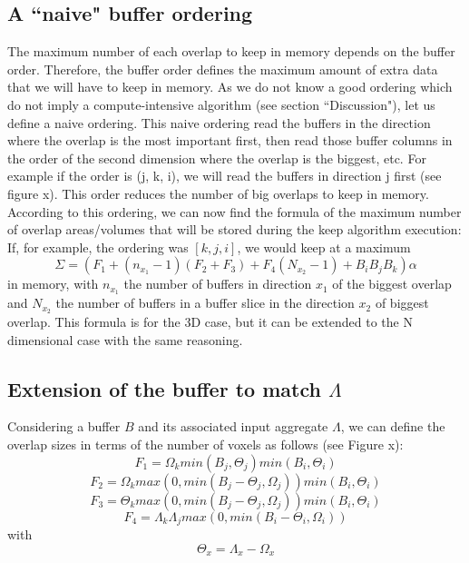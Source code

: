 \documentclass[conference]{IEEEtran}
\begin{document}
\subsection{A ``naive" buffer ordering}
The maximum number of each overlap to keep in memory depends on the buffer order.
Therefore, the buffer order defines the maximum amount of extra data that we will have to keep in memory.
As we do not know a good ordering which do not imply a compute-intensive algorithm (see section ``Discussion"), let us define a naive ordering.
This naive ordering read the buffers in the direction where the overlap is the most important first, then read those buffer columns in the order of the second dimension where the overlap is the biggest, etc.
For example if the order is (j, k, i), we will read the buffers in direction j first (see figure x).
This order reduces the number of big overlaps to keep in memory. \\

According to this ordering, we can now find the formula of the maximum number of overlap areas/volumes that will be stored during the keep algorithm execution:
If, for example, the ordering was $[k,j,i]$, we would keep at a maximum $$\Sigma = (F_1 + (n_{x_1}-1)(F_2 + F_3) + F_4(N_{x_2}-1) + B_iB_jB_k)\alpha$$ in memory, with $n_{x_1}$ the number of buffers in direction $x_1$ of the biggest overlap and $N_{x_2}$ the number of buffers in a buffer slice in the direction $x_2$ of biggest overlap.
This formula is for the 3D case, but it can be extended to the N dimensional case with the same reasoning.

\subsection{Extension of the buffer to match $\Lambda$}
Considering a buffer $B$ and its associated input aggregate $\Lambda$, we can define the overlap sizes in terms of the number of voxels as follows (see Figure x):
$$F_1 = \Omega_k min(B_j, \Theta_j) min(B_i, \Theta_i)$$
$$F_2 = \Omega_k max(0, min(B_j - \Theta_j, \Omega_j)) min(B_i, \Theta_i)$$
$$F_3 = \Theta_k max(0, min(B_j - \Theta_j, \Omega_j)) min(B_i, \Theta_i)$$
$$F_4 = \Lambda_k \Lambda_j max(0, min(B_i - \Theta_i, \Omega_i))$$
with
$$\Theta_x = \Lambda_x - \Omega_x$$
\end{document}
